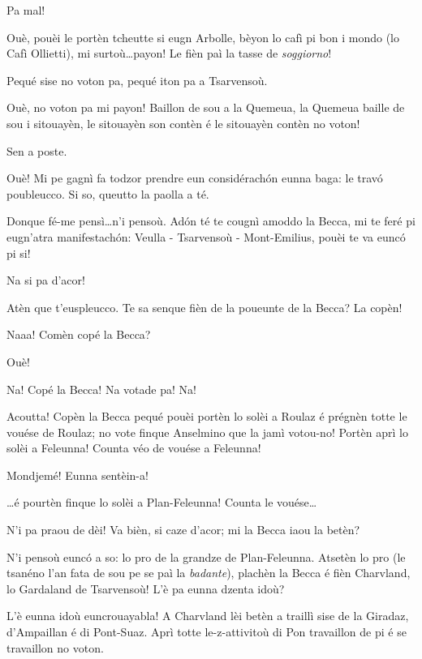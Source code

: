 \begin{drama}
\Ronnyspeaks Pa mal!

\Laurentspeaks Ouè, pouèi le portèn tcheutte si eugn Arbolle, bèyon lo cafì pi bon i mondo (lo Cafì Ollietti), mi surtoù\ldots payon! Le fièn paì la tasse de \textit{soggiorno}!

\Ronnyspeaks Pequé sise no voton pa, pequé iton pa a Tsarvensoù.

\Laurentspeaks Ouè, no voton pa mi payon! Baillon de sou a la Quemeua, la Quemeua baille de sou i sitouayèn, le sitouayèn son contèn é le sitouayèn contèn no voton!

\Ronnyspeaks Sen a poste.

\Laurentspeaks Ouè! Mi pe gagnì fa todzor prendre eun considérach\'on eunna baga: le trav\'o poubleucco. Si so, queutto la paolla a té.

\Ronnyspeaks Donque fé-me pensì\ldots n'i pensoù. Ad\'on té te cougnì amod\-do la Becca, mi te feré pi eugn'atra manifestach\'on: Veulla - Tsarvensoù - Mont-Emilius, pouèi te va euncó pi si!

\Laurentspeaks Na si pa d'acor!

\Ronnyspeaks Atèn que t'euspleucco. Te sa senque fièn de la poueunte de la Becca?  La copèn!

\Laurentspeaks Naaa! Comèn copé la Becca?

\Ronnyspeaks Ouè!

\Laurentspeaks {} Na! Copé la Becca! Na votade pa! Na!

\Ronnyspeaks Acoutta! Copèn la Becca pequé pouèi portèn lo solèi a Roulaz é prégnèn totte le vouése de Roulaz; no vote finque Anselmino que la jamì votou-no! Portèn aprì lo solèi a Feleunna! Counta véo de vouése a Feleunna!

\Laurentspeaks Mondjemé! Eunna sentèin-a!

\Ronnyspeaks \ldots é pourtèn finque lo solèi a Plan-Feleunna! Counta le vouése\ldots

\Laurentspeaks N'i pa praou de dèi! Va bièn, si caze d'acor; mi la Becca iaou la betèn?

\Ronnyspeaks N'i pensoù euncó a so: lo pro de la grandze de Plan-Feleun\-na. Atsetèn lo pro (le tsanéno l'an fata de sou pe se paì la \textit{badante}), plachèn la Becca é fièn Charvland, lo Gardaland de Tsarvensoù! L'è pa eunna dzenta idoù?

\Laurentspeaks L'è eunna idoù euncrouayabla! A Charvland lèi betèn a traillì sise de la Giradaz, d'Ampaillan é di Pont-Suaz. Aprì totte le-z-attivitoù di Pon travaillon de pi é se travaillon no voton.


\end{drama}
